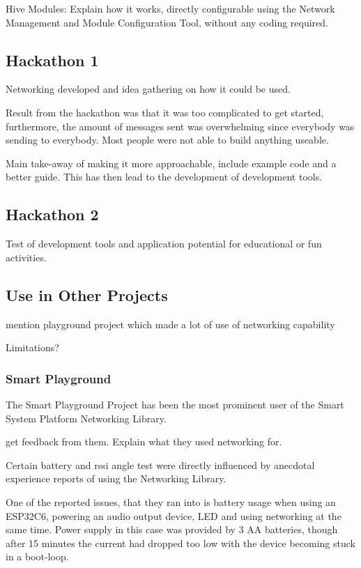 Hive Modules: Explain how it works, directly configurable using the Network Management and Module Configuration Tool, without any coding required. 

\subsection{\label{sec:res_hackathon1}Hackathon 1}

Networking developed and idea gathering on how it could be used.

Result from the hackathon was that it was too complicated to get started, furthermore, the amount of messages sent was overwhelming since everybody was sending to everybody. Most people were not able to build anything useable. 

Main take-away of making it more approachable, include example code and a better guide. This has then lead to the development of development tools.

\subsection{\label{sec:res_hackathon2}Hackathon 2}

Test of development tools and application potential for educational or fun activities.

\subsection{\label{sec:res_honourablementions}Use in Other Projects}

mention playground project which made a lot of use of networking capability

Limitations?

\subsubsection{\label{sec:res_smartplayground}Smart Playground}

The Smart Playground Project has been the most prominent user of the Smart System Platform Networking Library. 

get feedback from them. Explain what they used networking for.

Certain battery and rssi angle test were directly influenced by anecdotal experience reports of using the Networking Library.

One of the reported issues, that they ran into is battery usage when using an ESP32C6, powering an audio output device, LED and using networking at the same time. Power supply in this case was provided by 3 AA batteries, though after 15 minutes the current had dropped too low with the device becoming stuck in a boot-loop.

